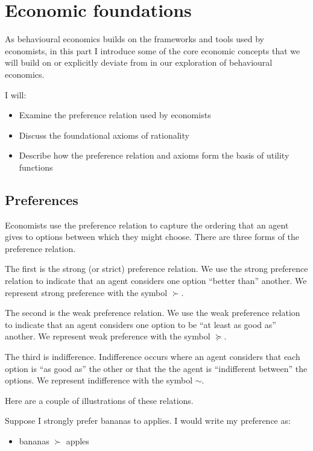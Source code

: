 \documentclass[
  letterpaper,
  DIV=11,
  numbers=noendperiod]{scrreprt}
\providecommand{\tightlist}{%
  \setlength{\itemsep}{0pt}\setlength{\parskip}{0pt}}\usepackage{longtable,booktabs,array}
\begin{document}
\part{Economic foundations}

As behavioural economics builds on the frameworks and tools used by
economists, in this part I introduce some of the core economic concepts
that we will build on or explicitly deviate from in our exploration of
behavioural economics.

I will:

\begin{itemize}
\tightlist
\item
  Examine the preference relation used by economists
\item
  Discuss the foundational axioms of rationality
\item
  Describe how the preference relation and axioms form the basis of
  utility functions
\end{itemize}

\hypertarget{preferences}{%
\chapter{Preferences}\label{preferences}}

Economists use the preference relation to capture the ordering that an
agent gives to options between which they might choose. There are three
forms of the preference relation.

The first is the strong (or strict) preference relation. We use the
strong preference relation to indicate that an agent considers one
option ``better than'' another. We represent strong preference with the
symbol \(\succ\).

The second is the weak preference relation. We use the weak preference
relation to indicate that an agent considers one option to be ``at least
as good as'' another. We represent weak preference with the symbol
\(\succcurlyeq\).

The third is indifference. Indifference occurs where an agent considers
that each option is ``as good as'' the other or that the the agent is
``indifferent between'' the options. We represent indifference with the
symbol \(\sim\).

Here are a couple of illustrations of these relations.

Suppose I strongly prefer bananas to applies. I would write my
preference as:

\begin{itemize}
\tightlist
\item
  bananas \(\succ\) apples
\end{itemize}
\end{document}
